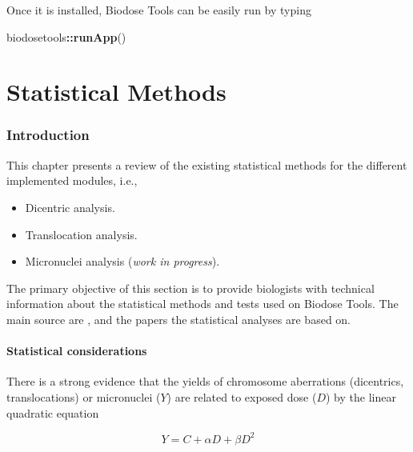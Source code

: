 \documentclass[]{scrartcl}
\newenvironment{Shaded}{\begin{snugshade}}{\end{snugshade}}
\newcommand{\KeywordTok}[1]{\textcolor[rgb]{0.13,0.29,0.53}{\textbf{#1}}}
\newcommand{\NormalTok}[1]{#1}
\newcommand{\OperatorTok}[1]{\textcolor[rgb]{0.81,0.36,0.00}{\textbf{#1}}}
\providecommand{\tightlist}{%
  \setlength{\itemsep}{0pt}\setlength{\parskip}{0pt}}
\begin{document}
Once it is installed, Biodose Tools can be easily run by typing

\begin{Shaded}
\begin{Highlighting}[]
\NormalTok{biodosetools}\OperatorTok{::}\KeywordTok{runApp}\NormalTok{()}
\end{Highlighting}
\end{Shaded}

\hypertarget{part-statistical-methods}{%
\part{Statistical Methods}\label{part-statistical-methods}}

\hypertarget{stats-intro}{%
\section{Introduction}\label{stats-intro}}

This chapter presents a review of the existing statistical methods for the different implemented modules, i.e.,

\begin{itemize}
\tightlist
\item
  Dicentric analysis.
\item
  Translocation analysis.
\item
  Micronuclei analysis (\emph{work in progress}).
\end{itemize}

The primary objective of this section is to provide biologists with technical information about the statistical methods and tests used on Biodose Tools. The main source are \citep{IAEA2001}, \citep{IAEA2011} and the papers the statistical analyses are based on.

\hypertarget{stats-considerations}{%
\subsection{Statistical considerations}\label{stats-considerations}}

There is a strong evidence that the yields of chromosome aberrations (dicentrics, translocations) or micronuclei (\(Y\)) are related to exposed dose (\(D\)) by the linear quadratic equation

\begin{equation} 
  Y = C + \alpha D + \beta D^2
  \label{eq:dose-response-lq}
\end{equation}
\end{document}
